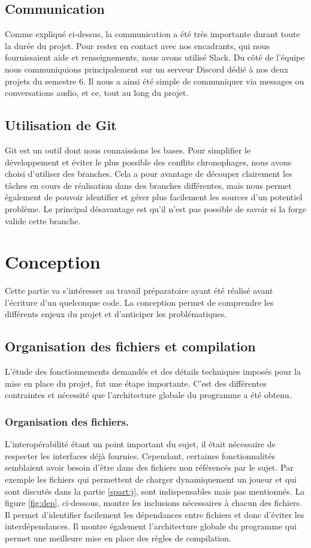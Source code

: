 \documentclass[a4paper, 12pt]{article}
\begin{document}
\subsection{Communication}
Comme expliqué ci-dessus, la communication a été très importante durant toute la durée du projet. Pour rester en contact avec nos encadrants, qui nous fournissaient aide et renseignements, nous avons utilisé Slack. Du côté de l'équipe nous communiquions principalement sur un serveur Discord dédié à nos deux projets du semestre 6. Il nous a ainsi été simple de communiquer via messages ou conversations audio, et ce, tout au long du projet.

\subsection{Utilisation de Git}
Git est un outil dont nous connaissions les bases. Pour simplifier le développement et éviter le plus possible des conflits chronophages, nous avons choisi d'utiliser des branches. Cela a pour avantage de découper clairement les tâches en cours de réalisation dans des branches différentes, mais nous permet également de pouvoir identifier et gérer plus facilement les sources d'un potentiel problème. Le principal désavantage est qu'il n'est pas possible de savoir si la forge valide cette branche.

\section{Conception}
Cette partie va s'intéresser au travail préparatoire ayant été réalisé avant l'écriture d'un quelconque code. La conception permet de comprendre les différents enjeux du projet et d'anticiper les problématiques.

\subsection{Organisation des fichiers et compilation}
L'étude des fonctionnements demandés et des détails techniques imposés pour la mise en place du projet, fut une étape importante. C'est des différentes contraintes et nécessité que l'architecture globale du programme a été obtenu.

\subsubsection{Organisation des fichiers.}
L'interopérabilité étant un point important du sujet, il était nécessaire de respecter les interfaces déjà fournies. Cependant, certaines fonctionnalités semblaient avoir besoin d'être dans des fichiers non référencés par le sujet. Par exemple les fichiers qui permettent de charger dynamiquement un joueur et qui sont discutés dans la partie \ref{spart:j}, sont indispensables mais pas mentionnés. La figure \ref{fig:dep}, ci-dessous, montre les inclusions nécessaires à chacun des fichiers. Il permet d'identifier facilement les dépendances entre fichiers et donc d'éviter les interdépendances. Il montre également l'architecture globale du programme qui permet une meilleure mise en place des règles de compilation.
\end{document}
